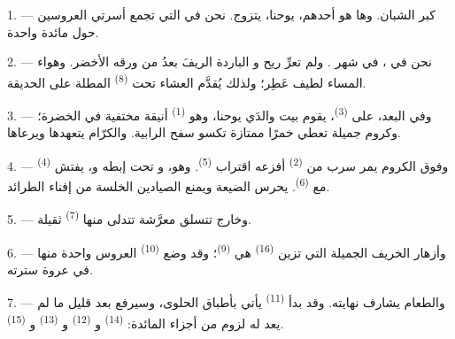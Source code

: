 
\VUsaut{4.0mm}
\VUsaut{1.6mm}
\VUsaut{3.2mm}

\VUsaut{1.6mm}
\VUsaut{2.6mm}

\VUsaut{3.0mm}

1. --- كبر الشبان. وها هو أحدهم، يوحنا، يتزوج. نحن في 
التي تجمع أسرتي العروسين حول مائدة واحدة.

2. --- نحن في ، في شهر . ولم تعرِّ ريح
 و الباردة الريفَ بعدُ من ورقه الأخضر. وهواء
المساء لطيف عَطِر؛ ولذلك يُقدَّم العشاء تحت  \textsuperscript{(8)}
المطلة على الحديقة.

3. --- وفي البعد، على  \textsuperscript{(3)}، يقوم بيت والدَي
يوحنا، وهو  \textsuperscript{(1)} أنيقة مختفية في الخضرة؛
وكروم جميلة تعطي خمرًا ممتازة تكسو سفح الرابية. والكرّام يتعهدها ويرعاها.

4. --- وفوق الكروم يمر سرب من  \textsuperscript{(2)} أفزعه اقتراب
 \textsuperscript{(5)}. وهو، و تحت إبطه
و، يفتش  \textsuperscript{(4)} مع
 \textsuperscript{(6)}. يحرس الضيعة ويمنع الصيادين الخلسة من
إفناء الطرائد.

5. --- وخارج  تتسلق  معرَّشة تتدلى منها
 \textsuperscript{(7)} ثقيلة.

6. --- وأزهار الخريف الجميلة التي تزين  \textsuperscript{(16)}
هي  \textsuperscript{(9)}؛ وقد وضع  \textsuperscript{(10)}
العروس واحدة منها في عروة سترته.

7. --- والطعام يشارف نهايته. وقد بدأ  \textsuperscript{(11)} يأتي
بأطباق الحلوى، وسيرفع بعد قليل ما لم يعد له لزوم من أجزاء المائدة:
 \textsuperscript{(14)} و \textsuperscript{(12)}
و \textsuperscript{(13)} و \textsuperscript{(15)}.

